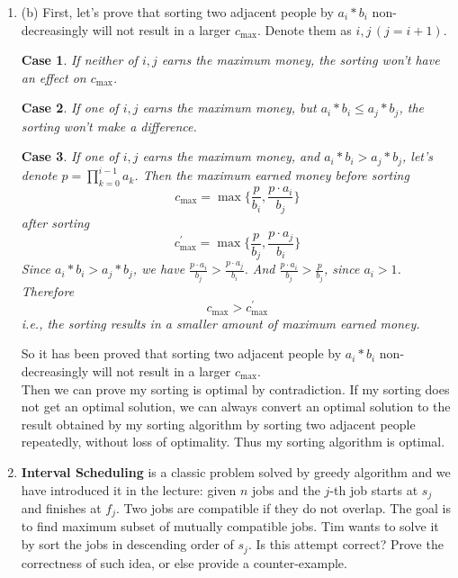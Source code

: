 \documentclass[12pt,a4paper]{article}
\makeatletter
\theoremstyle{case}
\newtheorem{case}{Case}
\newtheorem*{solution}{Solution}
\theoremstyle{definition}
\renewenvironment{solution}[1][Solution] {\par\pushQED{\qed}\normalfont\topsep6\p@\@plus6\p@\relax\trivlist\item[\hskip\labelsep\bfseries#1\@addpunct{.}]\ignorespaces}{\popQED\endtrivlist\@endpefalse} \makeatother
\makeatother
\begin{document}
\begin{enumerate}
\begin{solution}
\begin{minipage}[t]{0.90\textwidth}
\begin{algorithm}[H]
			\end{algorithm}
        \end{minipage}
    	(b) First, let's prove that sorting two adjacent people by $a_i * b_i$ non-decreasingly will not result in a larger $c_{\text{max}}$. Denote them as $i,j \, (j=i+1)$. 
    	\begin{case}
    		If neither of $i, j$ earns the maximum money, the sorting won't have an effect on $c_{\text{max}}$.
    	\end{case}
    	\begin{case}
    		If one of $i,j$ earns the maximum money, but $a_i * b_i \leq a_j * b_j$, the sorting won't make a difference. 
    	\end{case}
    	\begin{case}
    		If one of $i,j$ earns the maximum money, and $a_i * b_i > a_j * b_j$, let's denote $p = \prod\limits_{k=0}^{i-1} a_k$. Then the maximum earned money before sorting
    		\[c_{\text{max}} = \max \{\frac{p}{b_i}, \frac{p \cdot a_i}{b_j}\}\]
    		after sorting
    		\[c_{\text{max}}^{\prime} = \max \{\frac{p}{b_j}, \frac{p \cdot a_j}{b_i}\}\]
    		Since $a_i * b_i > a_j * b_j$, we have $\frac{p \cdot a_i}{b_j} > \frac{p \cdot a_j}{b_i}$. And $\frac{p \cdot a_i}{b_j} > \frac{p}{b_j}$, since $a_i > 1$. Therefore
    		\[c_{\text{max}} > c_{\text{max}}^{\prime}\]
    		i.e., the sorting results in a smaller amount of maximum earned money.
    	\end{case}
    	So it has been proved that sorting two adjacent people by $a_i * b_i$ non-decreasingly will not result in a larger $c_{\text{max}}$. \\
    	Then we can prove my sorting is optimal by contradiction. If my sorting does not get an optimal solution, we can always convert an optimal solution to the result obtained by my sorting algorithm by sorting two adjacent people repeatedly, without loss of optimality. Thus my sorting algorithm is optimal. 
    \end{solution}

    \item
    \textbf{Interval Scheduling} is a classic problem solved by greedy algorithm and we have introduced it in the lecture: given $n$ jobs and the $j$-th job starts at $s_j$ and finishes at $f_j$. Two jobs are compatible if they do not overlap. The goal is to find maximum subset of mutually compatible jobs. Tim wants to solve it by sort the jobs in descending order of $s_j$. Is this attempt correct? Prove the correctness of such idea, or else provide a counter-example.


\end{enumerate}
\end{document}
